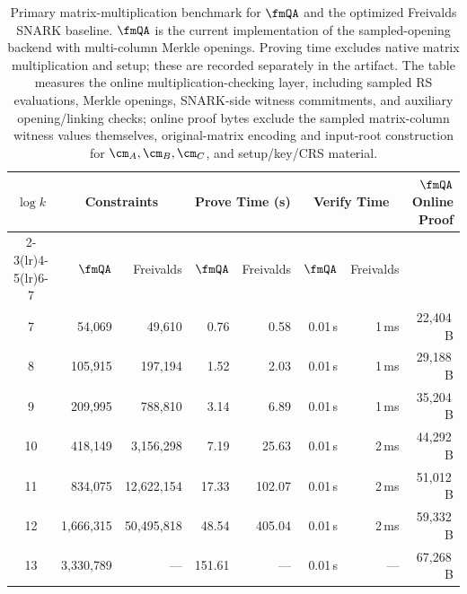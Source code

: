 \begin{table}[t]
\centering
\setlength{\tabcolsep}{4pt}
\footnotesize
\begin{tabular}{c rr rr rr r}
\toprule
\multirow{2}{*}{$\log k$}
  & \multicolumn{2}{c}{\textbf{Constraints}}
  & \multicolumn{2}{c}{\textbf{Prove Time (s)}}
  & \multicolumn{2}{c}{\textbf{Verify Time}}
  & \multirow{2}{*}{\textbf{$\fmQA$ Online Proof}} \\
\cmidrule(lr){2-3}\cmidrule(lr){4-5}\cmidrule(lr){6-7}
  & $\fmQA$ & Freivalds
  & $\fmQA$ & Freivalds
  & $\fmQA$ & Freivalds
  & \\
\midrule
7  & 54{,}069      & 49{,}610       & 0.76   & 0.58   & 0.01\,s & 1\,ms & 22{,}404\,B \\
8  & 105{,}915     & 197{,}194      & 1.52   & 2.03   & 0.01\,s & 1\,ms & 29{,}188\,B \\
9  & 209{,}995     & 788{,}810      & 3.14   & 6.89   & 0.01\,s & 1\,ms & 35{,}204\,B \\
10 & 418{,}149     & 3{,}156{,}298  & 7.19   & 25.63  & 0.01\,s & 2\,ms & 44{,}292\,B \\
11 & 834{,}075     & 12{,}622{,}154 & 17.33  & 102.07 & 0.01\,s & 2\,ms & 51{,}012\,B \\
12 & 1{,}666{,}315 & 50{,}495{,}818 & 48.54  & 405.04 & 0.01\,s & 2\,ms & 59{,}332\,B \\
13 & 3{,}330{,}789 & ---            & 151.61 & ---    & 0.01\,s & ---   & 67{,}268\,B \\
\bottomrule
\end{tabular}
\caption{Primary matrix-multiplication benchmark for $\fmQA$ and the optimized
Freivalds SNARK baseline. $\fmQA$ is the current implementation of the
sampled-opening backend with multi-column Merkle openings. Proving time excludes
native matrix multiplication and setup; these are recorded separately in the
artifact. The table measures the online multiplication-checking layer, including
sampled RS evaluations, Merkle openings, SNARK-side witness commitments, and
auxiliary opening/linking checks; online proof bytes exclude the sampled
matrix-column witness values themselves, original-matrix encoding and input-root construction
for $\cm_A,\cm_B,\cm_C$, and setup/key/CRS material.}
\label{tab:meow-vs-freivalds}
\end{table}
